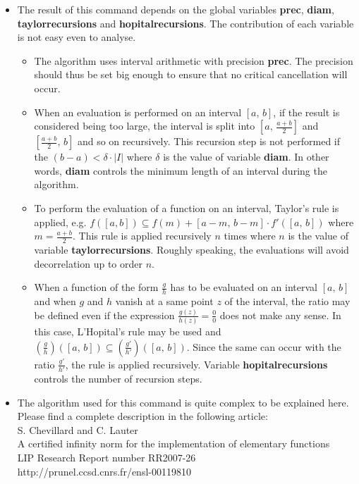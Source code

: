 \begin{itemize}
\item The result of this command depends on the global variables \textbf{prec}, \textbf{diam},
   \textbf{taylorrecursions} and \textbf{hopitalrecursions}. The contribution of each variable is 
   not easy even to analyse.
   \begin{itemize}
   \item  The algorithm uses interval arithmetic with precision \textbf{prec}. The
     precision should thus be set big enough to ensure that no critical
     cancellation will occur.
   \item  When an evaluation is performed on an interval $[a,\,b]$, if the result
     is considered being too large, the interval is split into $[a,\,\frac{a+b}{2}]$
     and $[\frac{a+b}{2},\,b]$ and so on recursively. This recursion step
     is  not performed if the $(b-a) < \delta \cdot |I|$ where $\delta$ is the value
     of variable \textbf{diam}. In other words, \textbf{diam} controls the minimum length of an
     interval during the algorithm.
   \item  To perform the evaluation of a function on an interval, Taylor's rule is
     applied, e.g. $f([a,b]) \subseteq f(m) + [a-m,\,b-m] \cdot f'([a,\,b])$
     where $m=\frac{a+b}{2}$. This rule is applied recursively $n$ times
     where $n$ is the value of variable \textbf{taylorrecursions}. Roughly speaking,
     the evaluations will avoid decorrelation up to order $n$.
   \item  When a function of the form $\frac{g}{h}$ has to be evaluated on an
     interval $[a,\,b]$ and when $g$ and $h$ vanish at a same point
     $z$ of the interval, the ratio may be defined even if the expression
     $\frac{g(z)}{h(z)}=\frac{0}{0}$ does not make any sense. In this case, L'Hopital's rule
     may be used and $\left(\frac{g}{h}\right)([a,\,b]) \subseteq \left(\frac{g'}{h'}\right)([a,\,b])$.
     Since the same can occur with the ratio $\frac{g'}{h'}$, the rule is applied
     recursively. Variable \textbf{hopitalrecursions} controls the number of 
     recursion steps.
   \end{itemize}

\item The algorithm used for this command is quite complex to be explained here. 
   Please find a complete description in the following article:\\
        S. Chevillard and C. Lauter\\
        A certified infinity norm for the implementation of elementary functions\\
        LIP Research Report number RR2007-26\\
        http://prunel.ccsd.cnrs.fr/ensl-00119810\\
\end{itemize}
